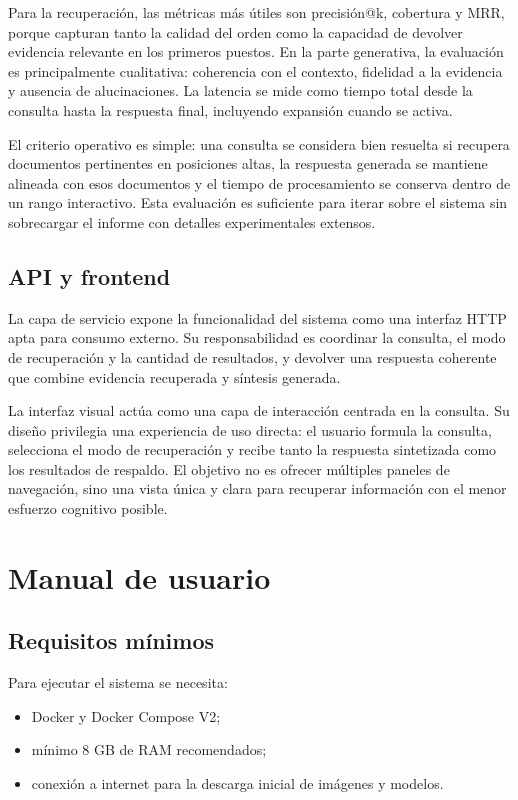 \documentclass{llncs}
\begin{document}
Para la recuperación, las métricas más útiles son precisión@k, cobertura y MRR, porque capturan tanto la calidad del orden como la capacidad de devolver evidencia relevante en los primeros puestos. En la parte generativa, la evaluación es principalmente cualitativa: coherencia con el contexto, fidelidad a la evidencia y ausencia de alucinaciones. La latencia se mide como tiempo total desde la consulta hasta la respuesta final, incluyendo expansión cuando se activa.

El criterio operativo es simple: una consulta se considera bien resuelta si recupera documentos pertinentes en posiciones altas, la respuesta generada se mantiene alineada con esos documentos y el tiempo de procesamiento se conserva dentro de un rango interactivo. Esta evaluación es suficiente para iterar sobre el sistema sin sobrecargar el informe con detalles experimentales extensos.
\subsection{API y frontend}

La capa de servicio expone la funcionalidad del sistema como una interfaz HTTP apta para consumo externo. Su responsabilidad es coordinar la consulta, el modo de recuperación y la cantidad de resultados, y devolver una respuesta coherente que combine evidencia recuperada y síntesis generada.

La interfaz visual actúa como una capa de interacción centrada en la consulta. Su diseño privilegia una experiencia de uso directa: el usuario formula la consulta, selecciona el modo de recuperación y recibe tanto la respuesta sintetizada como los resultados de respaldo. El objetivo no es ofrecer múltiples paneles de navegación, sino una vista única y clara para recuperar información con el menor esfuerzo cognitivo posible.

\section{Manual de usuario}

\subsection{Requisitos mínimos}

Para ejecutar el sistema se necesita:

\begin{itemize}
    \item Docker y Docker Compose V2;
    \item mínimo 8 GB de RAM recomendados;
    \item conexión a internet para la descarga inicial de imágenes y modelos.
\end{itemize}
\end{document}
